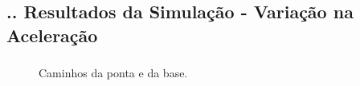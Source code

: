 \documentclass[aspectratio=169]{beamer}
\begin{document}
\subsection{\insertsectionnumber .\insertsubsectionnumber . Resultados da Simulação - Variação na Aceleração}

\begin{frame}
  \frametitle{\insertsubsection}
  \begin{figure}[H]
    \centering
    \caption{Caminhos da ponta e da base.}
    \hfill
  \end{figure}
\end{frame}
\end{document}
